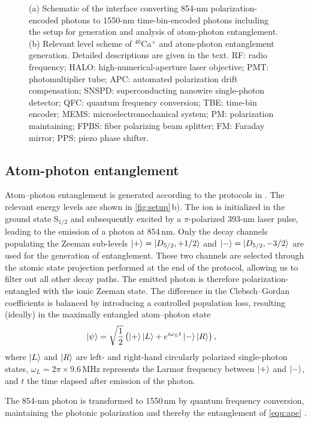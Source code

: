\documentclass[reprint, superscriptaddress, longbibliography, floatfix, twocolumn, nofootinbib, amsmath, amssymb, aps, showkeys]{revtex4-2}
\begin{document}
\begin{figure}[t]
{(a) Schematic of the interface converting 854-nm polarization-encoded photons to 1550-nm time-bin-encoded photons including the setup for generation and analysis of atom-photon entanglement. (b) Relevant level scheme of $^{40}$Ca$^+$ and atom-photon entanglement generation. Detailed descriptions are given in the text. RF: radio frequency; HALO: high-numerical-aperture laser objective; PMT: photomultiplier tube; APC: automated polarization drift compensation; SNSPD: superconducting nanowire single-photon detector; QFC: quantum frequency conversion; TBE: time-bin encoder; MEMS: microelectromechanical system; PM: polarization maintaining; FPBS: fiber polarizing beam splitter; FM: Faraday mirror; PPS: piezo phase shifter.}
\label{fig:setup}
\end{figure}


\subsection{Atom-photon entanglement}

Atom–photon entanglement is generated according to the protocols in \cite{Bock_2018, Bock_2024, Bergerhoff_2024, Bergerhoff_2026}. The relevant energy levels are shown in \autoref{fig:setup}\,b). The ion is initialized in the ground state S$_{1/2}$ and subsequently excited by a $\pi$-polarized 393-nm laser pulse, leading to the emission of a photon at $854\,$nm.
Only the decay channels populating the Zeeman sub-levels $\ket{+}=\ket{D_{5/2},+1/2}$ and $\ket{-}=\ket{D_{5/2},-3/2}$ are used for the generation of entanglement. These two channels are selected through the atomic state projection performed at the end of the protocol, allowing us to filter out all other decay paths. The emitted photon is therefore polarization-entangled with the ionic Zeeman state. The difference in the Clebsch–Gordan coefficients is balanced by introducing a controlled population loss, resulting (ideally) in the maximally entangled atom–photon state
\begin{align}
    \ket{\psi}  &= \sqrt{\frac{1}{2}} \left( \ket{+} \ket{L} + e^{i \omega_L t } \ket{-} \ket{R} \right), 
    \label{equ:ape} 
\end{align}
where $\ket{L}$ and $\ket{R}$ are left- and right-hand circularly polarized single-photon states, $\omega_L = 2\pi \times 9.6$\,MHz represents the Larmor frequency between $\ket{+}$ and $\ket{-}$, and $t$ the time elapsed after emission of the photon. 

The 854-nm photon is transformed to 1550\,nm by quantum frequency conversion, maintaining the photonic polarization and thereby the entanglement of \autoref{equ:ape} \cite{Bock_2024, Bergerhoff_2026}. 
\end{document}
